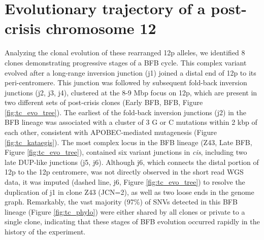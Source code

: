 \documentclass[phd,tocprelim]{cornell}
\begin{document}
\section{Evolutionary trajectory of a post-crisis chromosome 12}
Analyzing the clonal evolution of these rearranged 12p alleles, we identified 8 clones demonstrating progressive stages of a BFB cycle. This complex variant evolved after a long-range inversion junction (j1) joined a distal end of 12p to its peri-centromere. This junction was followed by subsequent fold-back inversion junctions (j2, j3, j4), clustered at the 8-9 Mbp focus on 12p, which are present in two different sets of post-crisis clones (Early BFB, BFB, Figure \ref{fig:tc_evo_tree}). The earliest of the fold-back inversion junctions (j2) in the BFB lineage was associated with a cluster of 3 G or C mutations within 2 kbp of each other, consistent with APOBEC-mediated mutagenesis \cite{Maciejowski2020-bw} (Figure \ref{fig:tc_kataegis}). The most complex locus in the BFB lineage (Z43, Late BFB, Figure \ref{fig:tc_evo_tree}), contained six variant junctions in \textit{cis}, including two late DUP-like junctions (j5, j6). Although j6, which connects the distal portion of 12p to the 12p centromere, was not directly observed in the short read WGS data, it was imputed (dashed line, j6, Figure \ref{fig:tc_evo_tree}) to resolve the duplication of j1 in clone Z43 (JCN=2), as well as two loose ends in the genome graph. Remarkably, the vast majority (97\%) of SNVs detected in this BFB lineage (Figure \ref{fig:tc_phylo}) were either shared by all clones or private to a single clone, indicating that these stages of BFB evolution occurred rapidly in the history of the experiment.
\end{document}
